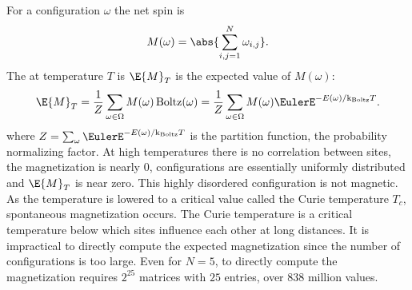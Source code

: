 \documentclass[12pt]{article}
\newcommand{\kT}{{\text k}_{\text{Boltz}}T}
\begin{document}
For a configuration \( \omega \) the net spin is
\[
    M(\omega) = \abs{\sum\limits_{i,j=1}^N \omega_{i,j}}.
\] The %
at temperature \( T \) is \( \E{M}_T \) is the expected value of \( M(\omega)
\):
\[
    \E{M}_T = \frac{1}{Z} \sum\limits_{\omega \in \Omega} M(\omega)
    \operatorname{Boltz}
    (\omega)
    = \frac{1}{Z} \sum\limits_{\omega \in \Omega} M(\omega) \EulerE^{-E
    (\omega)/\kT}.
\]
where \( Z = \sum_{\omega} \EulerE^{-E(\omega)/\kT} \) is the partition
function,%
the probability normalizing factor.  At high temperatures there is no
correlation between sites, the magnetization is nearly \( 0 \),
configurations are essentially uniformly distributed and \( \E{M}_T \)
is near zero.  This highly disordered configuration is not magnetic.  As
the temperature is lowered to a critical value called the Curie
temperature \( T_c \), spontaneous magnetization occurs.  The Curie
temperature is a critical temperature below which sites influence each
other at long distances.  It is impractical to directly compute the
expected magnetization since the number of configurations is too large.
Even for \( N=5 \), to directly compute the magnetization requires \( 2^
{25} \) matrices with \( 25 \) entries, over \( 838 \) million values.
\end{document}
